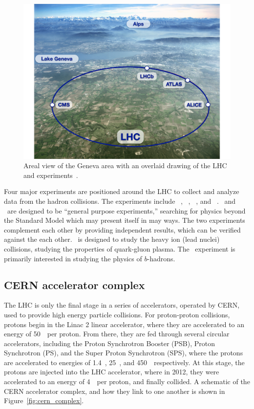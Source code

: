 \begin{figure}[ht]
  \centering
  \includegraphics[width=\textwidth, clip=true, trim=0 0 1cm 0]
    {figs/lhc/lhc_aerial.pdf}
  \caption{
    Areal view of the Geneva area with an overlaid drawing of the LHC
    and experiments~\cite{lhc_aerial}.
  }
  \label{fig:lhc_aerial}
\end{figure}

Four major experiments are positioned around the LHC to collect and analyze
data from the hadron collisions.
The experiments include \atlas~\cite{cern-jinst-atlas},
\cms~\cite{cern-jinst-cms}, \alice~\cite{cern-jinst-alice}, and
\lhcb~\cite{cern-jinst-lhcb}.
\atlas\ and \cms\ are designed to be ``general purpose experiments,'' searching
for physics beyond the Standard Model which may present itself in may ways.
The two experiments complement each other by providing independent results,
which can be verified against the each other.
\alice\ is designed to study the heavy ion (lead nuclei) collisions, studying
the properties of quark-gluon plasma.
The \lhcb\ experiment is primarily interested in studying the physics of
$b$-hadrons.

\FloatBarrier
\subsection{CERN accelerator complex}
\label{sec:accelerator_complex}

The LHC is only the final stage in a series of accelerators, operated by CERN,
used to provide high energy particle collisions.
For proton-proton collisions, protons begin in the Linac 2 linear
accelerator, where they are accelerated to an energy of 50~\MeV\ per proton.
From there, they are fed through several circular accelerators, including
the Proton Synchrotron Booster (PSB), Proton Synchrotron (PS), and the Super
Proton Synchrotron (SPS), where the protons are accelerated to energies of
1.4~\GeV, 25~\GeV, and 450~\GeV\ respectively.
At this stage, the protons are injected into the LHC accelerator, where 
in 2012, they were accelerated to an energy of 4~\TeV\ per proton, and finally
collided.
A schematic of the CERN accelerator complex, and how they link to one another
is shown in Figure~\ref{fig:cern_complex}.


